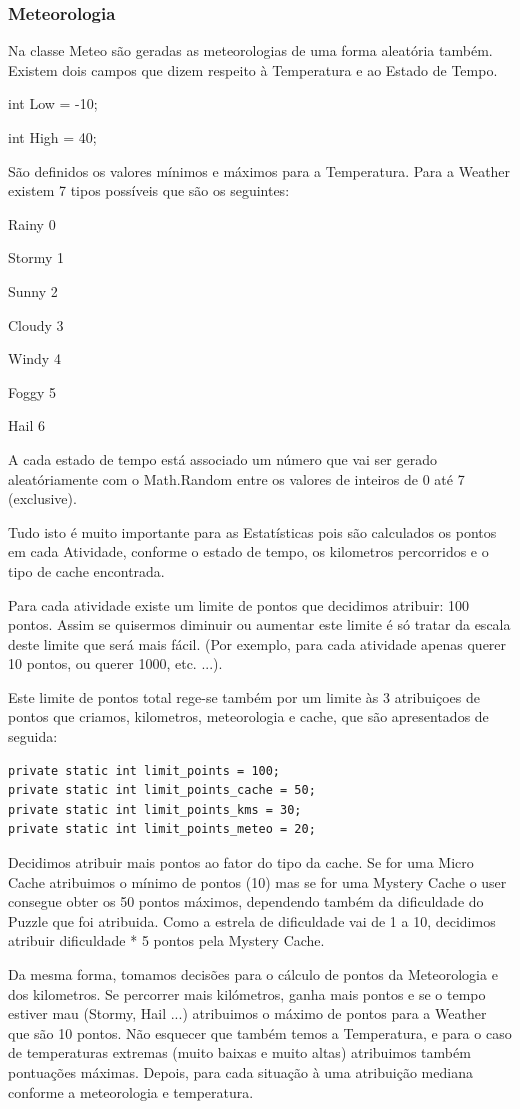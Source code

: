 \documentclass{article}
\begin{document}
\subsubsection{Meteorologia}
\quad  Na classe Meteo são geradas as meteorologias de uma forma aleatória também. Existem dois campos que dizem respeito à Temperatura e ao Estado de Tempo.
\par int Low = -10;
\par int High = 40;
\par São definidos os valores mínimos e máximos para a Temperatura. Para a Weather existem 7 tipos possíveis que são os seguintes:
\par Rainy 0
\par Stormy 1
\par Sunny 2
\par Cloudy 3
\par Windy 4
\par Foggy 5
\par Hail 6
\par A cada estado de tempo está associado um número que vai ser gerado aleatóriamente com o Math.Random entre os valores de inteiros de 0 até 7 (exclusive).
\\

\par Tudo isto é muito importante para as Estatísticas pois são calculados os pontos em cada Atividade, conforme o estado de tempo, os kilometros percorridos e o tipo de cache encontrada.
\par Para cada atividade existe um limite de pontos que decidimos atribuir: 100 pontos. Assim se quisermos diminuir ou aumentar este limite é só tratar da escala deste limite que será mais fácil. (Por exemplo, para cada atividade apenas querer 10 pontos, ou querer 1000, etc. ...).
\par Este limite de pontos total rege-se também por um limite às 3 atribuiçoes de pontos que criamos,  kilometros, meteorologia e cache, que são apresentados de seguida:
\begin{lstlisting}
private static int limit_points = 100;
private static int limit_points_cache = 50;
private static int limit_points_kms = 30;
private static int limit_points_meteo = 20;
\end{lstlisting}

\par * Decidimos atribuir mais pontos ao fator do tipo da cache. Se for uma Micro Cache atribuimos o mínimo de pontos (10) mas se for uma Mystery Cache o user consegue obter os 50 pontos máximos, dependendo também da dificuldade do Puzzle que foi atribuida. Como a estrela de dificuldade vai de 1 a 10, decidimos atribuir dificuldade * 5 pontos pela Mystery Cache.
\par Da mesma forma, tomamos decisões para o cálculo de pontos da Meteorologia e dos kilometros. Se percorrer mais kilómetros, ganha mais pontos e se o tempo estiver mau (Stormy, Hail ...) atribuimos o máximo de pontos para a Weather que são 10 pontos. Não esquecer que também temos a Temperatura, e para o caso de temperaturas extremas (muito baixas e muito altas) atribuimos também pontuações máximas. Depois, para cada situação à uma atribuição mediana conforme a meteorologia e temperatura.
\end{document}
